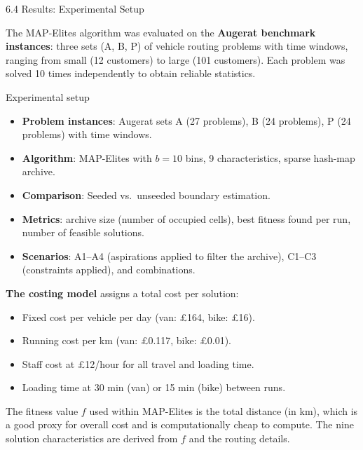 \documentclass[aspectratio=169,10pt]{beamer}
\begin{document}
\begin{frame}[allowframebreaks]{6.4 Results: Experimental Setup}

The MAP-Elites algorithm was evaluated on the \textbf{Augerat benchmark
instances}: three sets (A, B, P) of vehicle routing problems with
time windows, ranging from small (12 customers) to large (101
customers).
Each problem was solved 10 times independently to obtain reliable
statistics.

\medskip
\begin{block}{Experimental setup}
\begin{itemize}
  \item \textbf{Problem instances}: Augerat sets A (27 problems),
        B (24 problems), P (24 problems) with time windows.
  \item \textbf{Algorithm}: MAP-Elites with $b=10$ bins,
        9 characteristics, sparse hash-map archive.
  \item \textbf{Comparison}: Seeded vs.\ unseeded boundary estimation.
  \item \textbf{Metrics}: archive size (number of occupied cells),
        best fitness found per run, number of feasible solutions.
  \item \textbf{Scenarios}: A1--A4 (aspirations applied to filter the
        archive), C1--C3 (constraints applied), and combinations.
\end{itemize}
\end{block}

\medskip
\textbf{The costing model} assigns a total cost per solution:
\begin{itemize}
  \item Fixed cost per vehicle per day (van: \pounds164, bike: \pounds16).
  \item Running cost per km (van: \pounds0.117, bike: \pounds0.01).
  \item Staff cost at \pounds12/hour for all travel and loading time.
  \item Loading time at 30 min (van) or 15 min (bike) between runs.
\end{itemize}
The fitness value $f$ used within MAP-Elites is the total distance
(in km), which is a good proxy for overall cost and is computationally
cheap to compute.
The nine solution characteristics are derived from $f$ and the
routing details.

\end{frame}
\end{document}
